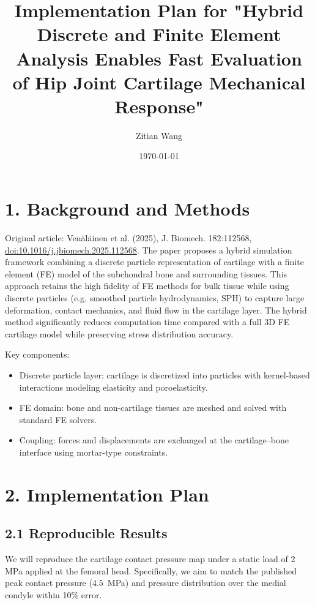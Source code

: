\documentclass[11pt]{article}
\title{Implementation Plan for "Hybrid Discrete and Finite Element Analysis Enables Fast Evaluation of Hip Joint Cartilage Mechanical Response"}
\author{Zitian Wang}
\date{\today}
\begin{document}
\maketitle

\section*{1. Background and Methods}
Original article: Venäläinen et al. (2025), J. Biomech. 182:112568, \href{https://doi.org/10.1016/j.jbiomech.2025.112568}{doi:10.1016/j.jbiomech.2025.112568}.
The paper proposes a hybrid simulation framework combining a discrete particle representation of cartilage with a finite element (FE) model of the subchondral bone and surrounding tissues.  This approach retains the high fidelity of FE methods for bulk tissue while using discrete particles (e.g. smoothed particle hydrodynamics, SPH) to capture large deformation, contact mechanics, and fluid flow in the cartilage layer.  The hybrid method significantly reduces computation time compared with a full 3D FE cartilage model while preserving stress distribution accuracy.

Key components:
\begin{itemize}
  \item Discrete particle layer: cartilage is discretized into particles with kernel-based interactions modeling elasticity and poroelasticity.
  \item FE domain: bone and non-cartilage tissues are meshed and solved with standard FE solvers.
  \item Coupling: forces and displacements are exchanged at the cartilage–bone interface using mortar-type constraints.
\end{itemize}

\section*{2. Implementation Plan}
\subsection*{2.1 Reproducible Results}
We will reproduce the cartilage contact pressure map under a static load of 2\,MPa applied at the femoral head.  Specifically, we aim to match the published peak contact pressure (\SI{4.5}{MPa}) and pressure distribution over the medial condyle within 10\% error.
\end{document}
